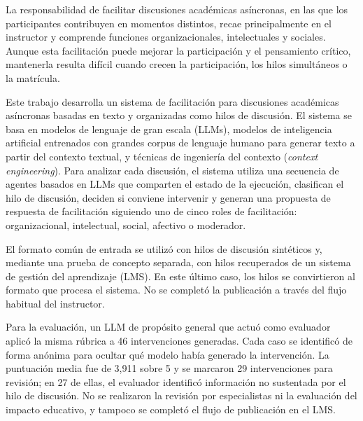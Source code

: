 \documentclass[tfm,estilo=digital,portada=normativa,estilobib=ieee]{fdi-simplex}
\begin{document}
\begin{resumen}
La responsabilidad de facilitar discusiones académicas asíncronas, en
las que los participantes contribuyen en momentos distintos, recae
principalmente en el instructor y comprende funciones
organizacionales, intelectuales y sociales. Aunque esta facilitación
puede mejorar la participación y el pensamiento crítico, mantenerla
resulta difícil cuando crecen la participación, los hilos simultáneos
o la matrícula.

Este trabajo desarrolla un sistema de facilitación para discusiones
académicas asíncronas basadas en texto y organizadas como hilos de
discusión. El sistema se basa en modelos de lenguaje de gran escala
(LLMs), modelos de inteligencia artificial
entrenados con grandes corpus de lenguaje humano para generar texto a
partir del contexto textual, y técnicas de ingeniería del contexto
(\textit{context engineering}).
Para analizar cada discusión, el sistema utiliza una secuencia de
agentes basados en LLMs que comparten el estado de la ejecución, clasifican el hilo de discusión,
deciden si conviene intervenir y generan una propuesta de respuesta
de facilitación
siguiendo uno de cinco roles de facilitación: organizacional,
intelectual, social, afectivo o moderador.

El formato común de entrada se utilizó con hilos de discusión
sintéticos y, mediante una prueba de concepto separada, con hilos
recuperados de un sistema de gestión del aprendizaje (LMS). En este
último caso, los hilos se convirtieron al formato que procesa el
sistema. No se completó la publicación a través del flujo habitual del
instructor.

Para la evaluación, un LLM de propósito general que actuó como
evaluador aplicó la misma rúbrica a 46 intervenciones generadas. Cada
caso se identificó de forma anónima para ocultar qué modelo había
generado la intervención. La puntuación media fue de 3,911 sobre 5 y
se marcaron 29 intervenciones para revisión; en 27 de ellas, el
evaluador identificó información no sustentada por el hilo de discusión. No se
realizaron la revisión por especialistas ni la evaluación del impacto
educativo, y tampoco se completó el flujo de publicación en el LMS.
\end{resumen}

\tableofcontents

\mainmatter









\appendix


\backmatter


\printbibliography[heading=bibintoc]
\end{document}
